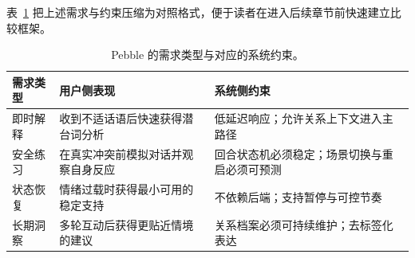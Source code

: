 表~\ref{tab:pebble-demand-constraints} 把上述需求与约束压缩为对照格式，便于读者在进入后续章节前快速建立比较框架。

\begin{table}[H]
  \centering
  \caption{Pebble 的需求类型与对应的系统约束。}
  \label{tab:pebble-demand-constraints}
  \begin{tabularx}{\textwidth}{>{\raggedright\arraybackslash}p{2.5cm} >{\raggedright\arraybackslash}X >{\raggedright\arraybackslash}X}
    \toprule
    需求类型 & 用户侧表现 & 系统侧约束 \\
    \midrule
    即时解释 & 收到不适话语后快速获得潜台词分析 & 低延迟响应；允许关系上下文进入主路径 \\
    安全练习 & 在真实冲突前模拟对话并观察自身反应 & 回合状态机必须稳定；场景切换与重启必须可预测 \\
    状态恢复 & 情绪过载时获得最小可用的稳定支持 & 不依赖后端；支持暂停与可控节奏 \\
    长期洞察 & 多轮互动后获得更贴近情境的建议 & 关系档案必须可持续维护；去标签化表达 \\
    \bottomrule
  \end{tabularx}
\end{table}

